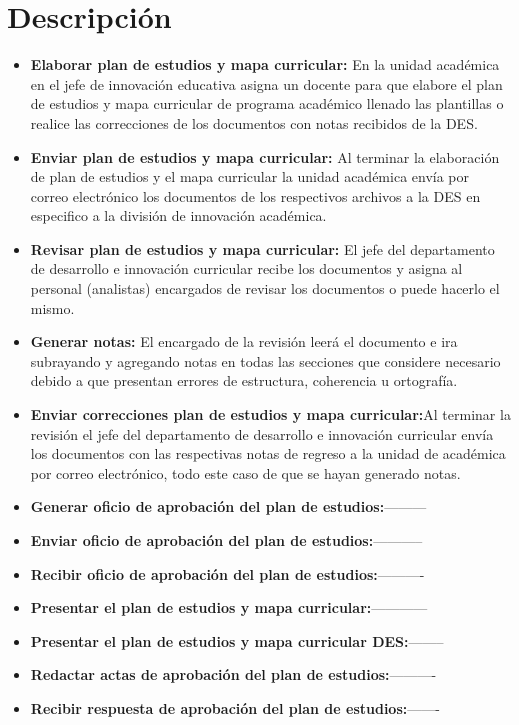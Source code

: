 \section{Descripción}
\begin{itemize}
	\item \textbf{Elaborar plan de estudios y mapa curricular:} En la unidad académica en el jefe de innovación educativa asigna un docente para que elabore el plan de estudios y mapa curricular de programa académico llenado las plantillas o realice las correcciones de los documentos con notas recibidos de la DES.  
	\item \textbf{Enviar plan de estudios y mapa curricular:} Al terminar la elaboración de plan de estudios y el mapa curricular la unidad académica envía por correo electrónico los documentos de los respectivos archivos a la DES en especifico a la división de innovación académica.  
	\item \textbf{Revisar plan de estudios y mapa curricular:} El jefe del departamento de desarrollo e innovación curricular recibe los documentos y asigna al personal (analistas) encargados de revisar los documentos o puede hacerlo el mismo. 
	\item \textbf{Generar notas:} El encargado de la revisión leerá el documento e ira subrayando y agregando notas en todas las secciones que considere necesario debido a que presentan errores de estructura, coherencia u ortografía.   
	\item \textbf{Enviar correcciones plan de estudios y mapa curricular:}Al terminar la revisión el jefe del departamento de desarrollo e innovación curricular envía los documentos con las respectivas notas de regreso a la unidad de académica por correo electrónico, todo este caso de que se hayan generado notas. 
	\item \textbf{Generar oficio de aprobación del  plan de estudios:}---------
	\item \textbf{Enviar oficio de aprobación del plan de estudios:}-----------
	\item \textbf{Recibir oficio de aprobación del plan de estudios:}----------
	\item \textbf{Presentar el plan de estudios y mapa curricular:}------------
	\item \textbf{Presentar el plan de estudios y mapa curricular DES:}--------
	\item \textbf{Redactar actas de aprobación del plan de estudios:}----------
	\item \textbf{Recibir respuesta de aprobación del plan de estudios:}-------

\end{itemize}
